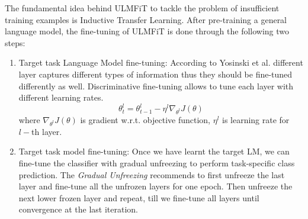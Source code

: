 	The fundamental idea behind ULMFiT to tackle the problem of insufficient training examples is Inductive Transfer Learning\cite{pan2009survey}. 
After pre-training a general language model, the fine-tuning of ULMFiT is done through the following two steps:
\begin{enumerate}
	\item Target task Language Model fine-tuning:	According to Yosinski et al. \cite{yosinski2014transferable} different layer captures different types of information thus they should be fine-tuned differently as well. Discriminative fine-tuning allows  to tune each layer with different learning
		rates.  
		\[\theta_t^l=\theta_{t-1}^l -\eta ^l \nabla_{\theta^l} J(\theta)  \] where $\nabla_{\theta^l} J(\theta)$ is gradient w.r.t. objective function, $\eta^l$ is learning rate for $l-$th layer. 
		\item Target task model fine-tuning: Once we have learnt the target LM, we can fine-tune the classifier with gradual unfreezing to perform task-specific class prediction. The \textit{Gradual Unfreezing} recommends to first unfreeze the last layer and fine-tune all the unfrozen layers for one epoch. Then unfreeze the next lower frozen layer and repeat, till we fine-tune all layers until convergence at the last iteration.
	\end{enumerate}

